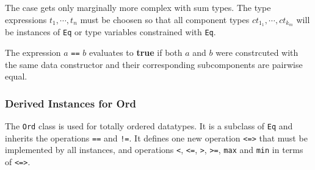 The case gets only marginally more complex with sum types.
The type expressions $t_1, \cdots, t_n$ must be choosen so that all component types $ct_{1_1}, \cdots, ct_{k_m}$ will be instances of \texttt{Eq} or type variables constrained with \texttt{Eq}.

The expression $a$ \texttt{==} $b$ evaluates to \textbf{true} if both $a$ and $b$ were constrcuted with the same data constructor and their corresponding subcomponents are pairwise equal.

\subsubsection{Derived Instances for Ord}
The \texttt{Ord} class is used for totally ordered datatypes. It is a subclass of \texttt{Eq} and inherits the operations \texttt{==} and \texttt{!=}. It defines one new operation \texttt{<=>} that must be implemented by all instances, and operations \texttt{<}, \texttt{<=}, \texttt{>}, \texttt{>=}, \texttt{max} and \texttt{min} in terms of \texttt{<=>}.

